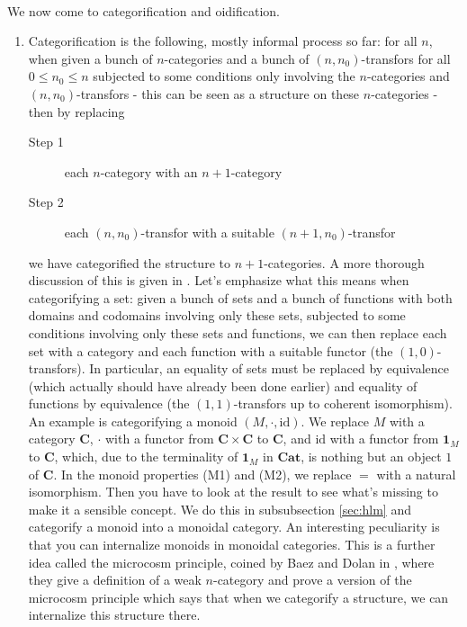 \\
We now come to categorification and oidification.
\begin{enumerate}
\item[(RC)]
Categorification is the following, mostly informal process so far: for all $n$, when given a bunch of $n$-categories and a bunch of $(n,n_{0})$-transfors for all $0 \leq n_{0} \leq n$ subjected to some conditions only involving the $n$-categories and $(n,n_{0})$-transfors - this can be seen as a structure on these $n$-categories - then by replacing
\begin{description}
\item[Step 1]
each $n$-category with an $n+1$-category
\item[Step 2]
each $(n,n_{0})$-transfor with a suitable $(n+1,n_{0})$-transfor
\end{description}
we have categorified the structure to $n+1$-categories.
A more thorough discussion of this is given in \cite{66edf75b}.
Let's emphasize what this means when categorifying a set: given a bunch of sets and a bunch of functions with both domains and codomains involving only these sets, subjected to some conditions involving only these sets and functions, we can then replace each set with a category and each function with a suitable functor (the $(1,0)$-transfors).
In particular, an equality of sets must be replaced by equivalence (which actually should have already been done earlier) and equality of functions by equivalence (the $(1,1)$-transfors up to coherent isomorphism).
\\
An example is categorifying a monoid $(M,\cdot,\mathrm{id})$.
We replace $M$ with a category $\mathbf{C}$, $\cdot$ with a functor from $\mathbf{C} \times \mathbf{C}$ to $\mathbf{C}$, and $\mathrm{id}$ with a functor from $\mathbf{1}_{M}$ to $\mathbf{C}$, which, due to the terminality of $\mathbf{1}_{M}$ in $\mathbf{Cat}$, is nothing but an object $1$ of $\mathbf{C}$.
In the monoid properties (M1) and (M2), we replace $=$ with a natural isomorphism.
Then you have to look at the result to see what's missing to make it a sensible concept.
We do this in subsubsection \ref{sec:hlm} and categorify a monoid into a monoidal category.
An interesting peculiarity is that you can internalize monoids in monoidal categories.
This is a further idea called the microcosm principle, coined by Baez and Dolan in \cite{0d7b89ad}, where they give a definition of a weak $n$-category and prove a version of the microcosm principle which says that when we categorify a structure, we can internalize this structure there.

\end{enumerate}
